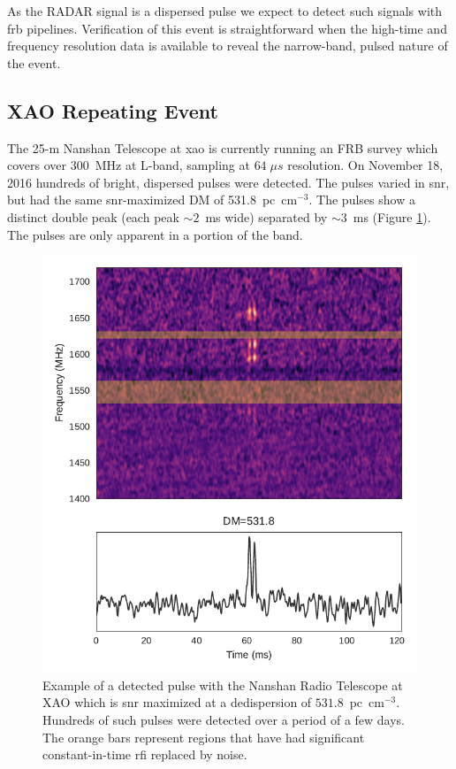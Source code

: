 \documentclass[a4paper,fleqn,usenatbib]{mnras}
\begin{document}
As the RADAR signal is a dispersed pulse we expect to detect such signals with
\gls{frb} pipelines.  Verification of this event is straightforward when the
high-time and frequency resolution data is available to reveal the narrow-band,
pulsed nature of the event.

\subsection{XAO Repeating Event}
\label{sec:xao_event}

The 25-m Nanshan Telescope at \gls{xao} is currently running an FRB survey which
covers over 300~MHz at L-band, sampling at $64 \; \mu s$ resolution. On November
18, 2016 hundreds of bright, dispersed pulses were detected. The pulses varied
in \gls{snr}, but had the same \gls{snr}-maximized DM of 531.8~pc~cm$^{-3}$. The
pulses show a distinct double peak (each peak $\sim 2$~ms wide) separated by
$\sim 3$~ms (Figure \ref{fig:xao_dynamic}). The pulses are only apparent in a
portion of the band.

\begin{figure}
    \includegraphics[width=1.0\linewidth]{figures/XAO_pulse_dynamic.pdf}
    \caption{Example of a detected pulse with the Nanshan Radio Telescope at XAO
    which is \gls{snr} maximized at a dedispersion of $531.8$~pc~cm$^{-3}$.
    Hundreds of such pulses were detected over a period of a few days. The
    orange bars represent regions that have had significant constant-in-time
    \gls{rfi} replaced by noise.
    }
    \label{fig:xao_dynamic}
\end{figure}
\end{document}
